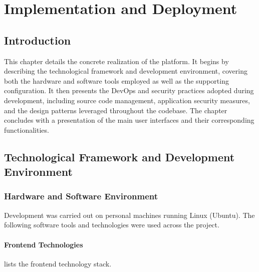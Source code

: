 \chapter{Implementation and Deployment}
\label{chap:implementation}

\section*{Introduction}

This chapter details the concrete realization of the \eduspace{} platform.
It begins by describing the technological framework and development environment, covering both the hardware and software tools employed as well as the supporting configuration.
It then presents the DevOps and security practices adopted during development, including source code management, application security measures, and the design patterns leveraged throughout the codebase.
The chapter concludes with a presentation of the main user interfaces and their corresponding functionalities.

\section{Technological Framework and Development Environment}
\label{sec:tech-framework}

\subsection{Hardware and Software Environment}
\label{sec:environment}

Development was carried out on personal machines running Linux (Ubuntu).
The following software tools and technologies were used across the project.

\subsubsection{Frontend Technologies}

 lists the frontend technology stack.

